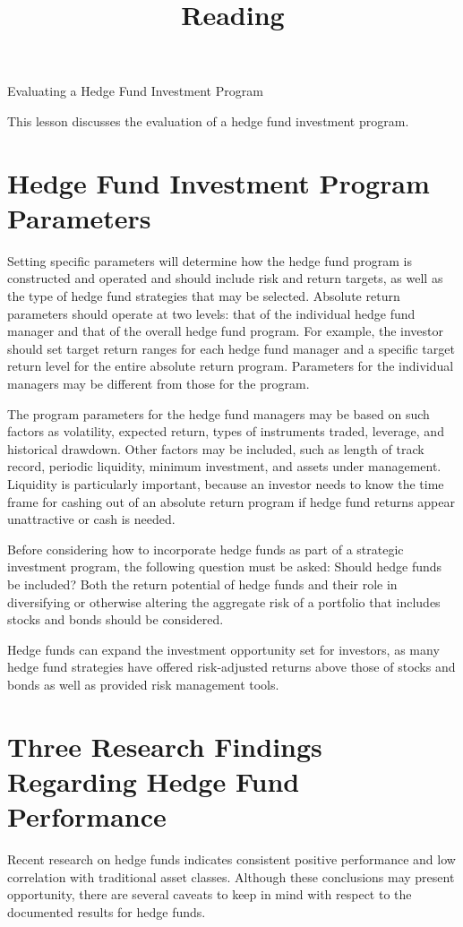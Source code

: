 \documentclass[11pt]{article}
\title{Reading }
\author{}
\date{}
\begin{document}
\maketitle
Evaluating a Hedge Fund Investment Program

This lesson discusses the evaluation of a hedge fund investment program.

\section*{Hedge Fund Investment Program Parameters}
Setting specific parameters will determine how the hedge fund program is constructed and operated and should include risk and return targets, as well as the type of hedge fund strategies that may be selected. Absolute return parameters should operate at two levels: that of the individual hedge fund manager and that of the overall hedge fund program. For example, the investor should set target return ranges for each hedge fund manager and a specific target return level for the entire absolute return program. Parameters for the individual managers may be different from those for the program.

The program parameters for the hedge fund managers may be based on such factors as volatility, expected return, types of instruments traded, leverage, and historical drawdown. Other factors may be included, such as length of track record, periodic liquidity, minimum investment, and assets under management. Liquidity is particularly important, because an investor needs to know the time frame for cashing out of an absolute return program if hedge fund returns appear unattractive or cash is needed.

Before considering how to incorporate hedge funds as part of a strategic investment program, the following question must be asked: Should hedge funds be included? Both the return potential of hedge funds and their role in diversifying or otherwise altering the aggregate risk of a portfolio that includes stocks and bonds should be considered.

Hedge funds can expand the investment opportunity set for investors, as many hedge fund strategies have offered risk-adjusted returns above those of stocks and bonds as well as provided risk management tools.

\section*{Three Research Findings Regarding Hedge Fund Performance}
Recent research on hedge funds indicates consistent positive performance and low correlation with traditional asset classes. Although these conclusions may present opportunity, there are several caveats to keep in mind with respect to the documented results for hedge funds.
\end{document}
